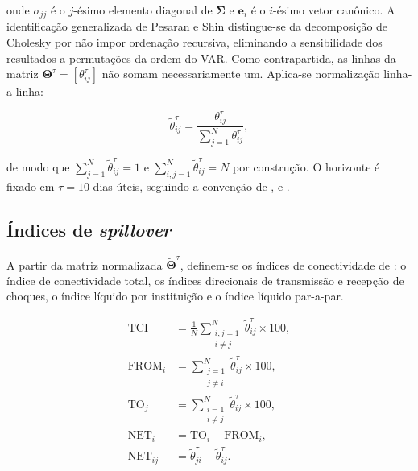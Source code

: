 \documentclass[12pt, a4paper, oneside, english, brazil]{abntex2}
\begin{document}
\noindent onde $\sigma_{jj}$ é o $j$-ésimo elemento diagonal de $\boldsymbol{\Sigma}$ e
$\mathbf{e}_i$ é o $i$-ésimo vetor canônico. A identificação generalizada de Pesaran e
Shin distingue-se da decomposição de Cholesky por não impor ordenação recursiva,
eliminando a sensibilidade dos resultados a permutações da ordem do VAR. Como
contrapartida, as linhas da matriz $\boldsymbol{\Theta}^{\tau} = [\theta^{\tau}_{ij}]$ não
somam necessariamente um. Aplica-se normalização linha-a-linha:

\begin{equation}
  \tilde{\theta}^{\tau}_{ij}
    = \frac{\theta^{\tau}_{ij}}{\displaystyle\sum_{j=1}^{N}\theta^{\tau}_{ij}},
  \label{eq:norm}
\end{equation}

\noindent de modo que $\sum_{j=1}^{N}\tilde{\theta}^{\tau}_{ij} = 1$ e
$\sum_{i,j=1}^{N}\tilde{\theta}^{\tau}_{ij} = N$ por construção. O horizonte é fixado em
$\tau = 10$ dias úteis, seguindo a convenção de
\textcite{diebold2009}, \textcite{diebold2012} e \textcite{diebold2014}.

\subsection*{Índices de \textit{spillover}}

A partir da matriz normalizada $\tilde{\boldsymbol{\Theta}}^{\tau}$, definem-se os índices
de conectividade de \textcite{diebold2012}: o índice de conectividade total, os índices
direcionais de transmissão e recepção de choques, o índice líquido por instituição e o
índice líquido par-a-par.

\begin{align}
  \text{TCI}
    &= \frac{1}{N}
       \sum_{\substack{i,j=1\\i\neq j}}^{N}
       \tilde{\theta}^{\tau}_{ij}
       \times 100,
  \label{eq:tci}\\[6pt]
  \text{FROM}_i
    &= \sum_{\substack{j=1\\j\neq i}}^{N}
       \tilde{\theta}^{\tau}_{ij}
       \times 100,
  \label{eq:from}\\[6pt]
  \text{TO}_j
    &= \sum_{\substack{i=1\\i\neq j}}^{N}
       \tilde{\theta}^{\tau}_{ij}
       \times 100,
  \label{eq:to}\\[6pt]
  \text{NET}_i
    &= \text{TO}_i - \text{FROM}_i,
  \label{eq:net}\\[6pt]
  \text{NET}_{ij}
    &= \tilde{\theta}^{\tau}_{ji} - \tilde{\theta}^{\tau}_{ij}.
  \label{eq:pairwise}
\end{align}
\end{document}
